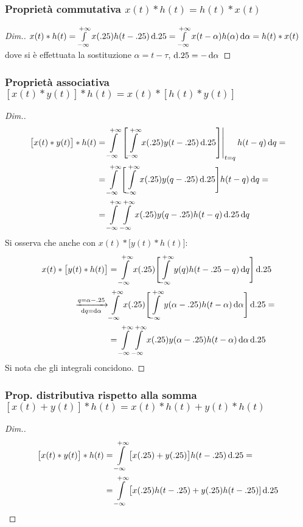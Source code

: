 \subsubsection{Proprietà commutativa $x(t)\ast h(t)= h(t)\ast x(t)$}
\begin{proof}[Dim.]
$x(t)\ast h(t)=\intinf{x(\tau)h(t-\tau)}{\tau}=\intinf{x(t-\alpha)h(\alpha)}{\alpha}=h(t)\ast x(t)$ dove si è effettuata la sostituzione $\alpha=t-\tau$, $\diff\tau=-\diff\alpha$
\end{proof}

\subsubsection{Proprietà associativa $[x(t)\ast y(t)]\ast h(t)= x(t)\ast [h(t)\ast y(t)]$}
\begin{proof}[Dim.]
\begin{align*}
	\bigl[x(t) \ast y(t)\bigr] \ast h(t)
	&= \intinf{\bound{t=q}{}{\intinf{x(\tau)y(t-\tau)}{\tau}}h(t-q)}{q} = \\
	&= \intinf{\Biggl[\intinf{x(\tau)y(q-\tau)}{\tau}\Biggr]h(t-q)}{q} = \\
	&= \intinf{\intinf{x(\tau)y(q-\tau)h(t-q)}{\tau}}{q}
\end{align*}
Si osserva che anche con \(x(t) \ast \bigl[y(t) \ast h(t)\bigr]\):
\begin{align*}
	x(t) \ast \bigl[y(t) \ast h(t)\bigr]
	&= \intinf{x(\tau)\Biggl[\intinf{y(q)h(t-\tau-q)}{q}\Biggr]}{\tau} \\
	\xrightarrow[\mathrm{d}q=\mathrm{d}\alpha]{q=\alpha-\tau}
	& \intinf{x(\tau)\Biggl[\intinf{y(\alpha-\tau)h(t-\alpha)}{\alpha}\Biggr]}{\tau} = \\
	&= \intinf{\intinf{x(\tau)y(\alpha-\tau)h(t-\alpha)}{\alpha}}{\tau}
\end{align*}
Si nota che gli integrali concidono.
\end{proof}
\subsubsection{Prop. distributiva rispetto alla somma $[x(t)+y(t)]\ast h(t)= x(t)\ast h(t)+y(t)\ast h(t)$}
\begin{proof}[Dim.]
\begin{align*}
	\bigl[x(t) \ast y(t)\bigr] \ast h(t)
	&= \intinf{\bigl[x(\tau) + y(\tau)\bigr]h(t-\tau)}{\tau} = \\
	&= \intinf{\bigl[x(\tau)h(t-\tau)+y(\tau)h(t-\tau)]}{\tau}
	\qedhere
\end{align*}
\end{proof}


